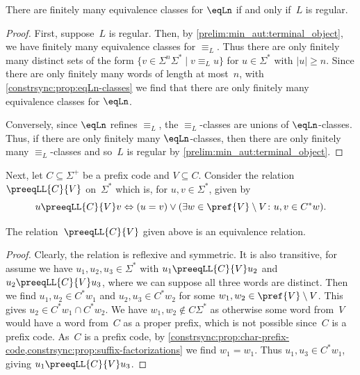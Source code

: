 \begin{corollary}
There are finitely many equivalence classes for $\eqLn$
if and only if~$L$ is regular.
\end{corollary}
\begin{proof}
First, suppose~$L$ is regular.
Then, by \cref{prelim:min_aut:terminal_object},
we have finitely many equivalence classes for $\equiv_L$.
Thus there are only finitely many 
distinct sets of the form $\{ v \in \Sigma^n\Sigma^* \mid v \equiv_L u \}$
for $u \in \Sigma^*$ with $|u| \ge n$.
Since there are only finitely many words of length at most~$n$,
with \cref{constrsync:prop:eqLn-classes} 
we find that there are only finitely many equivalence classes 
for $\eqLn$.

Conversely, since $\eqLn$ refines $\equiv_L$,
the  $\equiv_L$-classes	are unions of $\eqLn$-classes. Thus,
if there are only finitely many $\eqLn$-classes,
then there are only finitely many $\equiv_L$-classes
and so~$L$ is regular by \cref{prelim:min_aut:terminal_object}.
\end{proof}

\label{def:preeqLL}
Next, let $C \subseteq \Sigma^+$ be a prefix code and $V \subseteq C$. 
Consider the relation $\preeqLL{C}{V}$ on~$\Sigma^*$
which is, for $u,v \in \Sigma^*$, given by
\[
u \preeqLL{C}{V} v \Leftrightarrow ( u = v ) \lor ( \exists w \in \pref{V} \setminus V \colon u,v \in C^*w ).
\]

\begin{proposition}
The relation~$\preeqLL{C}{V}$ given above is an equivalence relation.
\end{proposition}
\begin{proof} 
Clearly, the relation is reflexive and symmetric.
It is also transitive, for assume we have $u_1, u_2, u_3 \in \Sigma^*$
with $u_1 \preeqLL{C}{V} u_2$ and $u_2 \preeqLL{C}{V} u_3$, where we can suppose all three words are distinct.
Then we find $u_1, u_2 \in C^* w_1$ and $u_2, u_3 \in C^* w_2$
for some $w_1, w_2 \in \pref{V} \setminus V$.
This gives  $u_2 \in C^* w_1 \cap C^* w_2$.
We have $w_1, w_2 \notin C\Sigma^*$
as otherwise some word from~$V$ would have a word from~$C$
as a proper prefix, which is not possible since~$C$ is a prefix code.
As~$C$ is a prefix code,
by \cref{constrsync:prop:char-prefix-code,constrsync:prop:suffix-factorizations}
we find $w_1 = w_1$.
Thus $u_1, u_3 \in C^* w_1$, giving $u_1 \preeqLL{C}{V} u_3$.
\end{proof}

